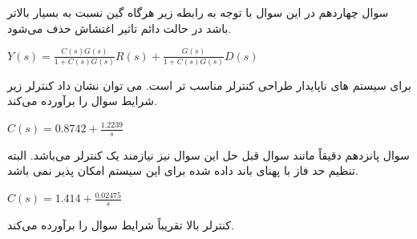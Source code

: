 \documentclass{article}
\begin{document}
\begin{problem}{سوال چهاردهم}
	در این سوال با توجه به رابطه زیر هرگاه گین 
	نسبت به 
	بسیار بالاتر باشد در حالت دائم تاثیر اغتشاش حذف می‌شود.
	
	\raggedleft
	$Y(s) = \frac{C(s)G(s)}{1 + C(s)G(s)} R(s) + \frac{G(s)}{1 + C(s)G(s)} D(s)$
	
	\raggedright
	
	برای سیستم های ناپایدار طراحی کنترلر  مناسب تر است.
	می توان نشان داد کنترلر زیر شرایط سوال را برآورده می‌کند.
	
	\raggedleft
	$C(s) = 0.8742 + \frac{1.2239}{s}$

	

	
\end{problem}


\begin{problem}{سوال پانزدهم}
	دقیقاً مانند سوال قبل حل این سوال نیز نیازمند یک کنترلر  می‌باشد.
	البته تنظیم حد فاز با پهنای باند داده شده برای این سیستم امکان پذیر نمی باشد.
	
	$C(s) = 1.414 + \frac{0.02475}{s}$
	
	کنترلر بالا تقریباً شرایط سوال را برآورده می‌کند.
	
\end{problem}
\end{document}
